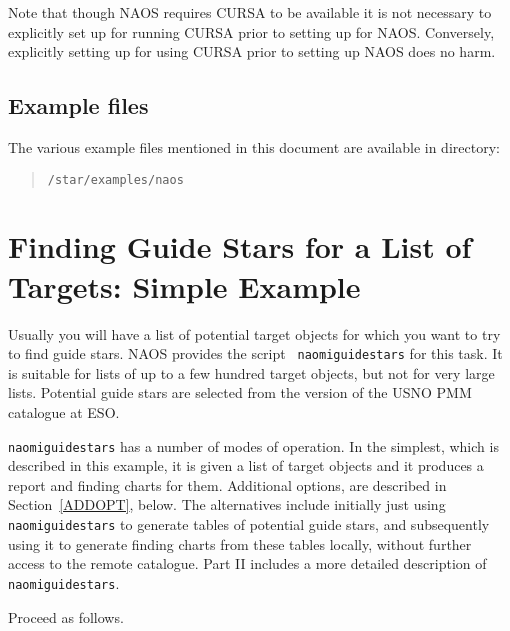 \documentclass[twoside,11pt]{article}
\newcommand{\xlabel}[1]{}
\renewcommand{\_}{\texttt{\symbol{95}}}
\begin{document}
Note that though NAOS requires CURSA to be available it is not necessary
to explicitly set up for running CURSA prior to setting up for NAOS.
Conversely, explicitly setting up for using CURSA prior to setting up NAOS
does no harm.

\subsection{Example files}

The various example files mentioned in this document are available in
directory:

\begin{quote}
{\tt /star/examples/naos}
\end{quote}


\newpage
\section{\xlabel{LIST}\label{LIST}Finding Guide Stars for a List of Targets:
Simple Example}

Usually you will have a list of potential target objects for which you
want to try to find guide stars.  NAOS provides the script {\tt
naomiguidestars} for this task.  It is suitable for lists of up to a few
hundred target objects, but not for very large lists.  Potential guide
stars are selected from the version of the USNO PMM catalogue\cite{PMM}
at ESO.

{\tt naomiguidestars} has a number of modes of operation.  In the simplest,
which is described in this example, it is given a list of target objects
and it produces a report and finding charts for them.  Additional options,
are described in Section~\ref{ADDOPT}, below.  The alternatives include
initially just using {\tt naomiguidestars} to generate tables of
potential guide stars, and subsequently using it to generate finding charts
from these tables locally, without further access to the remote catalogue.
Part II includes a more detailed description of {\tt naomiguidestars}.

Proceed as follows.
\end{document}
